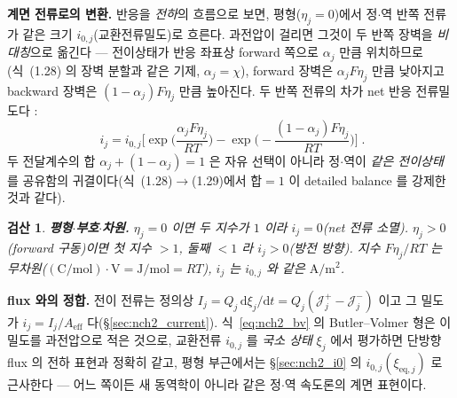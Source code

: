 \documentclass[11pt,a4paper]{article}
\newtheorem*{verifybox}{검산}
\newcommand{\dd}{\mathrm{d}}
\newcommand{\eff}{\mathrm{eff}}
\newcommand{\eq}{\mathrm{eq}}
\begin{document}
\textbf{계면 전류로의 변환.} 반응을 \emph{전하}의 흐름으로 보면, 평형($\eta_j=0$)에서 정$\cdot$역 반쪽 전류가 같은
크기 $i_{0,j}$(교환전류밀도)로 흐른다. 과전압이 걸리면 그것이 두 반쪽 장벽을 \emph{비대칭}으로 옮긴다 — 전이상태가
반응 좌표상 forward 쪽으로 $\alpha_j$ 만큼 위치하므로(식~(1.28) 의 장벽 분할과 같은 기제, $\alpha_j=\chi$), forward
장벽은 $\alpha_jF\eta_j$ 만큼 낮아지고 backward 장벽은 $(1-\alpha_j)F\eta_j$ 만큼 높아진다. 두 반쪽 전류의 차가
net 반응 전류밀도다 \cite{bardfaulkner,newman2004}:
\begin{equation}
\boxed{\;i_j=i_{0,j}\Big[\exp\!\Big(\frac{\alpha_jF\eta_j}{RT}\Big)-\exp\!\Big(-\frac{(1-\alpha_j)F\eta_j}{RT}\Big)\Big]\;.}
\label{eq:nch2_bv}
\end{equation}
두 전달계수의 합 $\alpha_j+(1-\alpha_j)=1$ 은 자유 선택이 아니라 정$\cdot$역이 \emph{같은 전이상태}를 공유함의
귀결이다(식~(1.28)$\to$(1.29)에서 합$=1$ 이 detailed balance 를 강제한 것과 같다).
\begin{verifybox}
\textbf{평형$\cdot$부호$\cdot$차원.} $\eta_j=0$ 이면 두 지수가 $1$ 이라 $i_j=0$(net 전류 소멸). $\eta_j>0$(forward
구동)이면 첫 지수 $>1$, 둘째 $<1$ 라 $i_j>0$(방전 방향). 지수 $F\eta_j/RT$ 는 무차원($\mathrm{(C/mol)\cdot V}
=\mathrm{J/mol}=RT$), $i_j$ 는 $i_{0,j}$ 와 같은 $\mathrm{A/m^2}$.
\end{verifybox}
\textbf{flux 와의 정합.} 전이 전류는 정의상 $I_j=Q_j\,\dd\xi_j/\dd t=Q_j(\mathcal J_j^+-\mathcal J_j^-)$ 이고 그
밀도가 $i_j=I_j/A_\eff$ 다(\S\ref{sec:nch2_current}). 식~\eqref{eq:nch2_bv} 의 Butler--Volmer 형은 이 밀도를
과전압으로 적은 것으로, 교환전류 $i_{0,j}$ 를 \emph{국소 상태} $\xi_j$ 에서 평가하면 단방향 flux 의 전하 표현과
정확히 같고, 평형 부근에서는 \S\ref{sec:nch2_i0} 의 $i_{0,j}(\xi_{\eq,j})$ 로 근사한다 — 어느 쪽이든 새 동역학이
아니라 같은 정$\cdot$역 속도론의 계면 표현이다.

\end{document}
